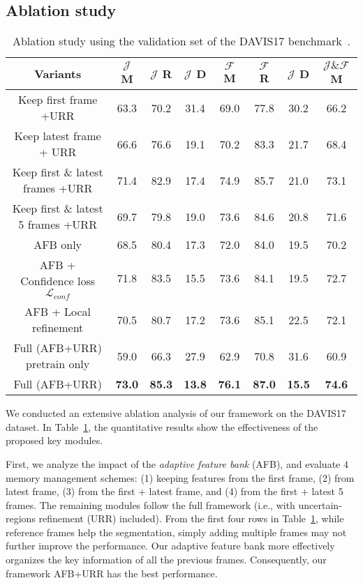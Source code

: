 \documentclass{article}
\begin{document}
\subsection{Ablation study}
\begin{table}[h]
  \caption{Ablation study using the validation set of the DAVIS17 benchmark~\cite{pont-tuset_2017_2018}.}
  \label{tbl:ablation}
  \centering
  \begin{tabular}{c|cccccc|c}
        \toprule
        Variants & $\mathcal{J}$ M & $\mathcal{J}$ R & $\mathcal{J}$ D & $\mathcal{F}$ M & $\mathcal{F}$ R & $\mathcal{J}$ D & $\mathcal{J} \& \mathcal{F}$ M\\
        \midrule
        Keep first frame +URR   & 63.3 & 70.2 & 31.4 & 69.0 & 77.8 & 30.2 & 66.2 \\
        Keep latest frame + URR & 66.6 & 76.6 & 19.1 & 70.2 & 83.3 & 21.7 & 68.4 \\
        Keep first \& latest frames +URR  & 71.4 & 82.9 & 17.4 & 74.9 & 85.7 & 21.0 & 73.1 \\
        Keep first \& latest 5 frames +URR & 69.7 & 79.8 & 19.0 & 73.6 & 84.6 & 20.8 & 71.6 \\
        \midrule
        AFB only & 68.5 & 80.4 & 17.3 & 72.0 & 84.0 & 19.5 & 70.2\\
        AFB + Confidence loss $\mathcal{L}_{conf}$  & 71.8 & 83.5 & 15.5 & 73.6 & 84.1 & 19.5 & 72.7\\
        AFB + Local refinement  & 70.5 & 80.7 & 17.2 & 73.6 & 85.1 & 22.5 & 72.1\\
        \midrule
        Full (AFB+URR) pretrain only & 59.0 & 66.3 & 27.9 & 62.9 & 70.8 & 31.6 & 60.9 \\
        Full (AFB+URR)      & \textbf{73.0} & \textbf{85.3} & \textbf{13.8} & \textbf{76.1} & \textbf{87.0} & \textbf{15.5} & \textbf{74.6} \\
        \bottomrule
    \end{tabular}
\end{table}

We conducted an extensive ablation analysis of our framework on the DAVIS17 dataset.
In Table~\ref{tbl:ablation}, the quantitative results show the effectiveness of the proposed key modules.

First, we analyze the impact of the \emph{adaptive feature bank} (AFB), and evaluate $4$ memory management schemes: (1) keeping features from the first frame,
(2) from latest frame, 
(3) from the first $+$ latest frame, and
(4) from the first $+$ latest 5 frames.
The remaining modules follow the full framework (i.e., with uncertain-regions refinement (URR) included). 
From the first four rows in Table~\ref{tbl:ablation}, while reference frames help the segmentation, simply adding multiple frames may not further improve the performance. 
Our adaptive feature bank more effectively organizes the key information of all the previous frames. 
Consequently, our framework AFB+URR has the best performance.
\end{document}
